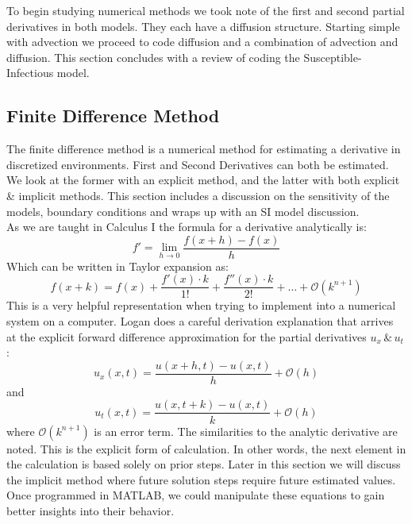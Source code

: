 \documentclass{article}
\begin{document}
 To begin studying numerical methods we took note of the first and second partial derivatives in both models. They each have a diffusion structure. Starting simple with advection we proceed to code diffusion and a combination of advection and diffusion.  This section concludes with a review of coding the Susceptible-Infectious model. 
\subsection{Finite Difference Method}
The finite difference method is a numerical method for estimating a derivative in discretized environments.  First and Second Derivatives can both be estimated.  We look at the former with an explicit method, and the latter with both explicit \& implicit methods. This section includes a discussion on the sensitivity of the models, boundary conditions and wraps up with an SI model discussion.   \\
As we are taught in Calculus I the formula for a derivative analytically is:
$$f'=\lim_{h\rightarrow0}\frac{f(x+h)-f(x)}{h}$$
Which can be written in Taylor expansion as:
$$f(x+k)=f(x)+\frac{f'(x)\cdot k}{1!}+\frac{f''(x)\cdot k}{2!}+\dots +\mathcal{O}(k^{n+1}) $$
This is a very helpful representation when trying to implement into a numerical system on a computer. Logan does a careful derivation explanation that arrives at the explicit forward difference approximation for the partial derivatives $u_x\,\& \,u_t$:
$$u_x(x,t)=\frac{u(x+h,t)-u(x,t)}{h}+\mathcal{O}(h)$$
and
$$u_t(x,t)=\frac{u(x,t+k)-u(x,t)}{k}+\mathcal{O}(h)$$
where $\mathcal{O}(k^{n+1})$ is an error term.  The similarities to the analytic derivative are noted.  This is the explicit form of calculation. In other words, the next element in the calculation is based solely on prior steps.  Later in this section we will discuss the implicit method where future solution steps require future estimated values.\\
Once programmed in MATLAB, we could manipulate these equations to gain better insights into their behavior.  \\
\end{document}
